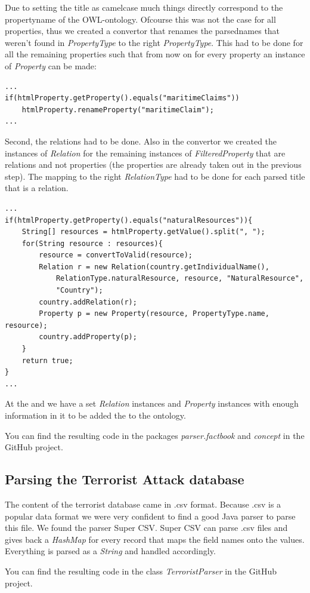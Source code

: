 \documentclass{article}
\begin{document}
Due to setting the title as camelcase much things directly correspond to the propertyname of the OWL-ontology.
Ofcourse this was not the case for all properties, thus we created a convertor that renames the parsednames that weren't found in \textit{PropertyType} to the right \textit{PropertyType}. This had to be done for all the remaining properties such that from now on for every property an instance of \textit{Property} can be made:
\begin{lstlisting}
...
if(htmlProperty.getProperty().equals("maritimeClaims"))
	htmlProperty.renameProperty("maritimeClaim");
...
\end{lstlisting}
Second, the relations had to be done. Also in the convertor we created the instances of \textit{Relation} for the remaining instances of \textit{FilteredProperty} that are relations and not properties (the properties are already taken out in the previous step).
The mapping to the right \textit{RelationType} had to be done for each parsed title that is a relation.
\begin{lstlisting}
...
if(htmlProperty.getProperty().equals("naturalResources")){
	String[] resources = htmlProperty.getValue().split(", ");
	for(String resource : resources){
		resource = convertToValid(resource);
		Relation r = new Relation(country.getIndividualName(), 
			RelationType.naturalResource, resource, "NaturalResource", 
			"Country");
		country.addRelation(r);
		Property p = new Property(resource, PropertyType.name, resource);
		country.addProperty(p);
	}
	return true;
}
...
\end{lstlisting}
At the and we have a set \textit{Relation} instances and \textit{Property} instances with enough information in it to be added the to the ontology.
\par
You can find the resulting code in the packages \textit{parser.factbook} and \textit{concept} in the GitHub project\cite{githubproject}.

\subsection{Parsing the Terrorist Attack database}
\label{sec:terrorist_db}
The content of the terrorist database came in .csv format. Because .csv is a popular data format we were very confident to find a good Java parser to parse this file. We found the parser Super CSV\cite{supercsv}. Super CSV can parse .csv files and gives back a \textit{HashMap} for every record that maps the field names onto the values. Everything is parsed as a \textit{String} and handled accordingly.\par
You can find the resulting code in the class \textit{TerroristParser} in the GitHub project\cite{githubproject}.
\end{document}
